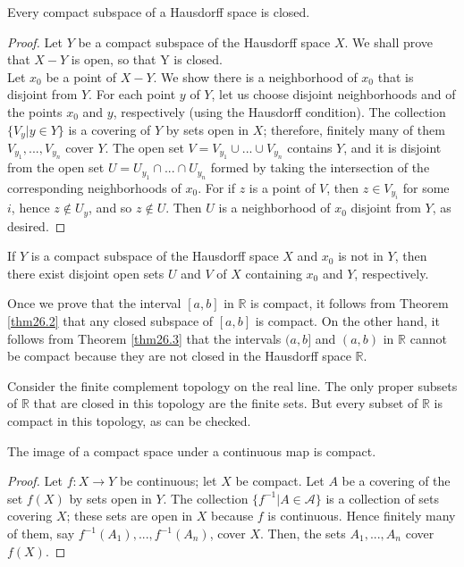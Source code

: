 \documentclass[a4paper,english,12pt]{article}
\begin{document}
\begin{thm}\label{thm26.3}
	Every compact subspace of a Hausdorff space is closed.
\end{thm}
\begin{proof}
	Let $Y$ be a compact subspace of the Hausdorff space $X$. We shall prove that $X - Y$ is open, so that Y is closed.\\
	Let $x_0$ be a point of $X - Y$. We show there is a neighborhood of $x_0$ that is disjoint	from $Y$. For each point $y$ of $Y$, let us choose disjoint neighborhoods and of the
	points $x_0$ and $y$, respectively (using the Hausdorff condition). The collection $\{V_y | y \in Y\}$ is a covering of $Y$ by sets open in $X$; therefore, finitely many of them $V_{y_1},...,V_{y_n}$ cover $Y$. The open set $V = V_{y_1} \cup ... \cup V_{y_n}$ contains $Y$, and it is disjoint from the open set $U = U_{y_1} \cap ... \cap U_{y_n}$ formed by taking the intersection of the corresponding neighborhoods of $x_0$. For if $z$ is a point of $V$, then $z \in V_{y_i}$ for some $i$, hence $z \notin U_y$, and so $z \notin U$. Then $U$ is a neighborhood of $x_0$ disjoint from $Y$, as desired. 
\end{proof}

\begin{lem}
	If $Y$ is a compact subspace of the Hausdorff space $X$ and $x_0$ is not in $Y$, then there exist disjoint open sets $U$ and $V$ of $X$ containing $x_0$ and $Y$, respectively.
\end{lem}

\begin{exmp}
	Once we prove that the interval $[a,b]$ in $\mathbb{R}$ is compact, it follows from	Theorem \ref{thm26.2} that any closed subspace of $[a,b]$ is compact. On the other hand, it follows from Theorem \ref{thm26.3} that the intervals $(a, b]$ and $(a, b)$ in $\mathbb{R}$ cannot be compact because they are not closed in the Hausdorff space $\mathbb{R}$.
\end{exmp}

\begin{exmp}
	Consider the finite complement topology on the real line. The only proper subsets of $\mathbb{R}$ that are closed in this topology are the finite sets. But every subset of $\mathbb{R}$ is compact in this topology, as can be checked.
\end{exmp}

\begin{thm}
	The image of a compact space under a continuous map is compact.
\end{thm}
\begin{proof}
	Let $f: X \rightarrow Y$ be continuous; let $X$ be compact. Let $A$ be a covering of the set $f(X)$ by sets open in $Y$. The collection $\{f^{-1} | A \in \mathcal{A}\}$ is a collection of sets covering $X$; these sets are open in $X$ because $f$ is continuous. Hence finitely many of them, say $f^{-1}(A_1),...,f^{-1}(A_n)$, cover $X$. Then, the sets $A_1,...,A_n$ cover $f(X)$.
\end{proof}
\end{document}

